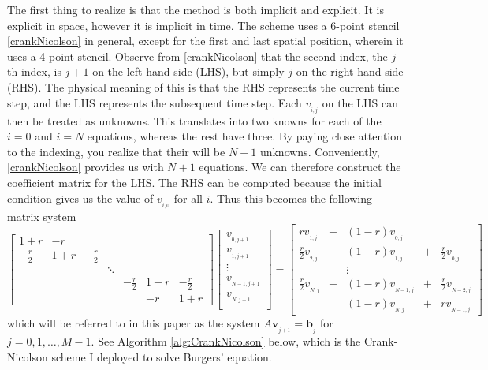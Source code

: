 \documentclass[undefended]{sfuthesis}
\begin{document}
The first thing to realize is that the method is both implicit and explicit. It is explicit in space, however it is implicit in time. The scheme uses a 6-point stencil \eqref{crankNicolson} in general, except for the first and last spatial position, wherein it uses a 4-point stencil. Observe from \eqref{crankNicolson} that the second index, the $j$-th index, is $j + 1$ on the left-hand side (LHS), but simply $j$ on the right hand side (RHS). The physical meaning of this is that the RHS represents the current time step, and the LHS represents the subsequent time step. Each $v_{_{i,j}}$ on the LHS can then be treated as unknowns. This translates into two knowns for each of the $i = 0$ and $i = N$ equations, whereas the rest have three. By paying close attention to the indexing, you realize that their will be $N + 1$ unknowns. Conveniently, \eqref{crankNicolson} provides us with $N + 1$ equations. We can therefore construct the coefficient matrix for the LHS. The RHS can be computed because the initial condition gives us the value of $v_{_{i, 0}}$ for all $i$. Thus this becomes the following matrix system 
\[
\begin{bmatrix}
1 + r & -r &&&&& \\
-\frac{r}{2} & 1 + r & -\frac{r}{2} &&&& \\
&&& \ddots &&& \\
&&&& -\frac{r}{2} & 1 + r & -\frac{r}{2} \\
&&&&& -r & 1 +r
\end{bmatrix}
\begin{bmatrix}
v_{_{0, j + 1}} \\
v_{_{1, j + 1}} \\
\vdots \\
v_{_{N - 1, j + 1}} \\
v_{_{N, j + 1}} \\
\end{bmatrix}
=
\begin{bmatrix}
r v_{_{1, j}} &+& (1 - r) v_{_{0, j}} && \\
\frac{r}{2} v_{_{2, j}} &+& (1 - r) v_{_{1, j}} &+& \frac{r}{2} v_{_{0, j}} \\
&&\vdots&& \\
\frac{r}{2} v_{_{N, j}} &+& (1 - r) v_{_{N - 1, j}} &+& \frac{r}{2} v_{_{N - 2, j}} \\
&& (1 - r) v_{_{N, j}} &+& r v_{_{N - 1, j}}
\end{bmatrix}
\]
which will be referred to in this paper as the system $A \textbf{v}_{_{j + 1}} = \textbf{b}_{_j}$ for $j = 0, 1, \dots, M - 1$. See Algorithm \ref{alg:CrankNicolson} below, which is the Crank-Nicolson scheme I deployed to solve Burgers' equation.
\end{document}
